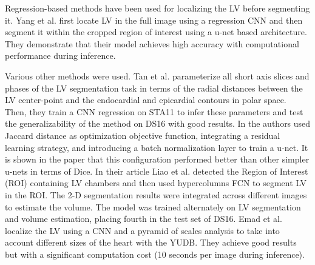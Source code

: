 \documentclass[journal]{IEEEtran}
\begin{document}
Regression-based methods have been used for localizing the LV before segmenting it.
Yang et al.\cite{yang2017deep} first locate LV in the full image using a regression CNN and then segment it within the cropped region of interest using a u-net based architecture.
They demonstrate that their model achieves high accuracy with computational performance during inference.

Various other methods were used.
Tan et al.\cite{tan2017convolutional} parameterize all short axis slices and phases of the LV segmentation task in terms of the radial distances between the LV center-point and the endocardial and epicardial contours in polar space.
Then, they train a CNN regression on STA11 to infer these parameters and test the generalizability of the method on DS16 with good results.
In\cite{curiale2017automatic} the authors used Jaccard distance as optimization objective function, integrating a residual learning strategy, and introducing a batch normalization layer to train a u-net.
It is shown in the paper that this configuration performed better than other simpler u-nets in terms of Dice.
In their article Liao et al.\cite{liao2017estimation} detected the Region of Interest (ROI) containing LV chambers and then used hypercolumns FCN to segment LV in the ROI\@.
The 2-D segmentation results were integrated across different images to estimate the volume.
The model was trained alternately on LV segmentation and volume estimation, placing fourth in the test set of DS16.
Emad et al.\cite{emad2015automatic} localize the LV using a CNN and a pyramid of scales analysis to take into account different sizes of the heart with the YUDB\@.
They achieve good results but with a significant computation cost (10 seconds per image during inference).
\end{document}

